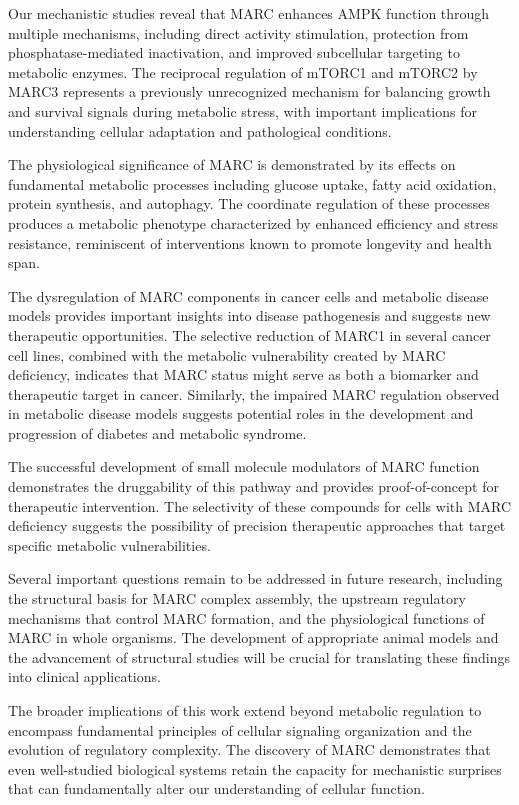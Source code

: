 \documentclass[11pt,a4paper]{article}
\begin{document}
Our mechanistic studies reveal that MARC enhances AMPK function through multiple mechanisms, including direct activity stimulation, protection from phosphatase-mediated inactivation, and improved subcellular targeting to metabolic enzymes. The reciprocal regulation of mTORC1 and mTORC2 by MARC3 represents a previously unrecognized mechanism for balancing growth and survival signals during metabolic stress, with important implications for understanding cellular adaptation and pathological conditions.

The physiological significance of MARC is demonstrated by its effects on fundamental metabolic processes including glucose uptake, fatty acid oxidation, protein synthesis, and autophagy. The coordinate regulation of these processes produces a metabolic phenotype characterized by enhanced efficiency and stress resistance, reminiscent of interventions known to promote longevity and health span.

The dysregulation of MARC components in cancer cells and metabolic disease models provides important insights into disease pathogenesis and suggests new therapeutic opportunities. The selective reduction of MARC1 in several cancer cell lines, combined with the metabolic vulnerability created by MARC deficiency, indicates that MARC status might serve as both a biomarker and therapeutic target in cancer. Similarly, the impaired MARC regulation observed in metabolic disease models suggests potential roles in the development and progression of diabetes and metabolic syndrome.

The successful development of small molecule modulators of MARC function demonstrates the druggability of this pathway and provides proof-of-concept for therapeutic intervention. The selectivity of these compounds for cells with MARC deficiency suggests the possibility of precision therapeutic approaches that target specific metabolic vulnerabilities.

Several important questions remain to be addressed in future research, including the structural basis for MARC complex assembly, the upstream regulatory mechanisms that control MARC formation, and the physiological functions of MARC in whole organisms. The development of appropriate animal models and the advancement of structural studies will be crucial for translating these findings into clinical applications.

The broader implications of this work extend beyond metabolic regulation to encompass fundamental principles of cellular signaling organization and the evolution of regulatory complexity. The discovery of MARC demonstrates that even well-studied biological systems retain the capacity for mechanistic surprises that can fundamentally alter our understanding of cellular function.
\end{document}
